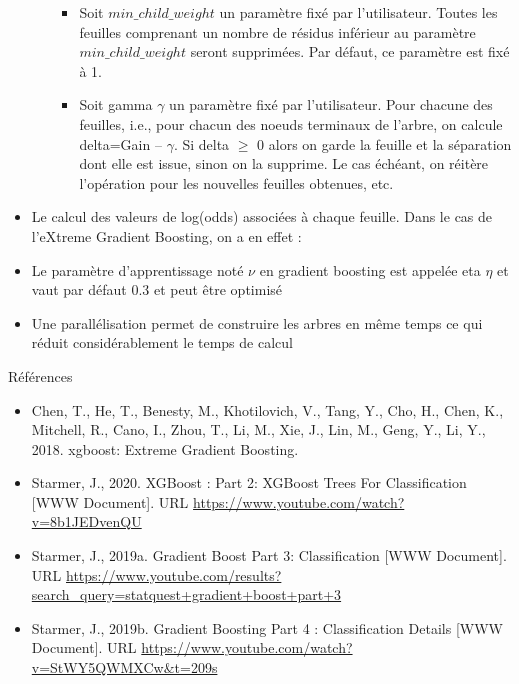 \documentclass[
]{article}
\begin{document}
\begin{itemize}
\begin{enumerate}
      \begin{itemize}
        \item Soit $min\_child\_weight$ un paramètre fixé par l’utilisateur. Toutes les feuilles comprenant un nombre de résidus inférieur au paramètre $min\_child\_weight$ seront supprimées. Par défaut, ce paramètre est fixé à 1. 
        
        \item  Soit gamma $\gamma$ un paramètre fixé par l’utilisateur. Pour chacune des feuilles, i.e., pour chacun des noeuds terminaux de l’arbre, on calcule delta=Gain – $\gamma$. Si delta $\geq$ 0 alors on garde la feuille et la séparation dont elle est issue, sinon on la supprime. Le cas échéant, on réitère l’opération pour les nouvelles feuilles obtenues, etc.
      \end{itemize}
    

   \end{enumerate}
   
   \item Le calcul des valeurs de log(odds) associées à chaque feuille. Dans le cas de l’eXtreme Gradient Boosting, on a en effet :
   
   \item Le paramètre d’apprentissage noté $\nu$ en gradient boosting est appelée eta $\eta$ et vaut par défaut 0.3 et peut être optimisé
   
   \item Une parallélisation permet de construire les arbres en même temps ce qui réduit considérablement le temps de calcul

\end{itemize}

Références

\begin{itemize}
\item
  Chen, T., He, T., Benesty, M., Khotilovich, V., Tang, Y., Cho, H.,
  Chen, K., Mitchell, R., Cano, I., Zhou, T., Li, M., Xie, J., Lin, M.,
  Geng, Y., Li, Y., 2018. xgboost: Extreme Gradient Boosting.
\item
  Starmer, J., 2020. XGBoost : Part 2: XGBoost Trees For Classification
  {[}WWW Document{]}. URL
  \url{https://www.youtube.com/watch?v=8b1JEDvenQU}
\item
  Starmer, J., 2019a. Gradient Boost Part 3: Classification {[}WWW
  Document{]}. URL
  \url{https://www.youtube.com/results?search_query=statquest+gradient+boost+part+3}
\item
  Starmer, J., 2019b. Gradient Boosting Part 4 : Classification Details
  {[}WWW Document{]}. URL
  \url{https://www.youtube.com/watch?v=StWY5QWMXCw\&t=209s}
\end{itemize}
\end{document}
